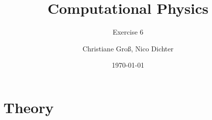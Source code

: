 \documentclass{scrartcl}
\title{Computational Physics}
\subtitle{Exercise 6}
\date{\today}
\author{Christiane Groß, Nico Dichter}
\begin{document}
	\maketitle
	
\section{Theory}


\newpage
\listoffigures
\listoftables
\printbibliography
\end{document}
